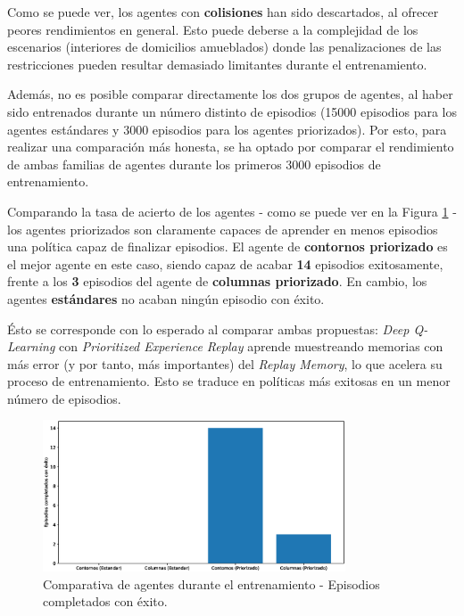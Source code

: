 Como se puede ver, los agentes con \textbf{colisiones} han sido descartados, al ofrecer peores rendimientos en general. Esto puede deberse a la complejidad de los escenarios (interiores de domicilios amueblados) donde las penalizaciones de las restricciones pueden resultar demasiado limitantes durante el entrenamiento.

Además, no es posible comparar directamente los dos grupos de agentes, al haber sido entrenados durante un número distinto de episodios (15000 episodios para los agentes estándares y 3000 episodios para los agentes priorizados). Por esto, para realizar una comparación más honesta, se ha optado por comparar el rendimiento de ambas familias de agentes durante los primeros 3000 episodios de entrenamiento.

Comparando la tasa de acierto de los agentes - como se puede ver en la Figura \ref{fig:chap6-comparison-success} - los agentes priorizados son claramente capaces de aprender en menos episodios una política capaz de finalizar episodios. El agente de \textbf{contornos priorizado} es el mejor agente en este caso, siendo capaz de acabar \textbf{14} episodios exitosamente, frente a los \textbf{3} episodios del agente de \textbf{columnas priorizado}. En cambio, los agentes \textbf{estándares} no acaban ningún episodio con éxito.

Ésto se corresponde con lo esperado al comparar ambas propuestas: \textit{Deep Q-Learning} con \textit{Prioritized Experience Replay} aprende muestreando memorias con más error (y por tanto, más importantes) del \textit{Replay Memory}, lo que acelera su proceso de entrenamiento. Esto se traduce en políticas más exitosas en un menor número de episodios.

\begin{figure}[h]
    \centering
    \includegraphics[width=0.8\textwidth]{imagenes/cap6/comparison/success.eps}
    \caption{Comparativa de agentes durante el entrenamiento - Episodios completados con éxito.}
    \label{fig:chap6-comparison-success}
\end{figure}

